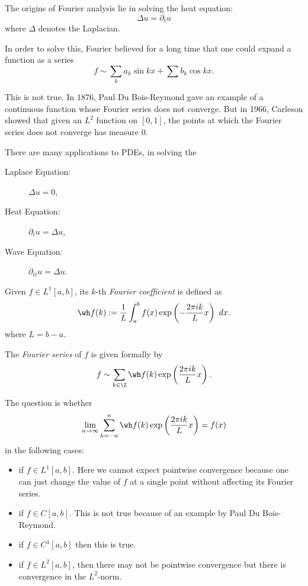 The origins of Fourier analysis lie in solving the heat equation:
\begin{equation*}
    \Delta u = \partial_t u
\end{equation*}
where $\Delta$ denotes the Laplacian.

In order to solve this, Fourier believed for a long time that one could expand a function as a series 
\begin{equation*}
    f\sim \sum_k a_k\sin kx + \sum b_k\cos kx.
\end{equation*}

This is not true. In 1876, Paul Du Bois-Reymond gave an example of a continuous function whose Fourier series does not converge. But in 1966, Carleson showed that given an $L^2$ function on $[0,1]$, the points at which the Fourier series does not converge has measure $0$.

There are many applications to PDEs, in solving the 
\begin{description}
    \item[Laplace Equation:] $\Delta u = 0$,
    \item[Heat Equation:] $\partial_t u = \Delta u$,
    \item[Wave Equation:] $\partial_{tt} u = \Delta u$.
\end{description}


\begin{definition}
    Given $f\in L^1[a, b]$, its $k$-th \emph{Fourier coefficient} is defined as 
    \begin{equation*}
        \wh f(k) := \frac{1}{L}\int_a^b f(x)\exp\left(-\frac{2\pi i k}{L}x\right)~dx.
    \end{equation*}
    where $L = b - a$.

    The \emph{Fourier series} of $f$ is given formally by 
    \begin{equation*}
        f\sim\sum_{k\in\Z}\wh f(k)\exp\left(\frac{2\pi i k}{L}x\right).
    \end{equation*}
\end{definition}

The question is whether 
\begin{equation*}
    \lim_{n\to\infty}\sum_{k= -n}^n \wh f(k)\exp\left(\frac{2\pi ik}{L}x\right) = f(x)
\end{equation*}
in the following cases: 
\begin{itemize}
    \item if $f\in L^1[a,b]$. Here we cannot expect pointwise convergence because one can just change the value of $f$ at a single point without affecting its Fourier series.
    \item if $f\in C[a,b]$. This is not true because of an example by Paul Du Bois-Reymond.
    \item if $f\in C^1[a,b]$ then this is true.
    \item if $f\in L^2[a,b]$, then there may not be pointwise convergence but there is convergence in the $L^2$-norm.
\end{itemize}

